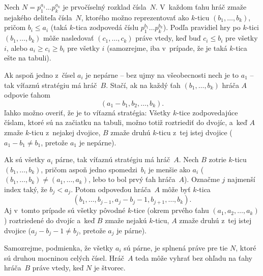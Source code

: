 {%
Nech $N=p_1^{a_1}\dots p_k^{a_k}$ je prvočíselný rozklad čísla~$N$.
V~každom ťahu hráč zmaže nejakého deliteľa čísla~$N$, ktorého možno reprezentovať ako $k$-ticu $(b_1,\dots,b_k)$, pričom $b_i\le a_i$
(taká $k$-tica zodpovedá číslu $p_1^{b_1}\dots p_k^{b_k}$). Podľa pravidiel hry po $k$-tici $(b_1,\dots,b_k)$ môže nasledovať $(c_1,\dots,c_k)$ práve vtedy, keď buď $c_{i}\le b_{i}$ pre všetky $i$, alebo
$a_i\ge c_i\ge b_{i}$ pre všetky $i$ (samozrejme, iba v~prípade, že je taká $k$-tica ešte na tabuli).

Ak aspoň jedno z~čísel $a_{i}$ je nepárne -- bez ujmy na všeobecnosti nech je to $a_1$ -- tak víťaznú stratégiu má hráč~$B$. Stačí, ak na každý ťah $(b_1,\dots,b_k)$ hráča $A$ odpovie ťahom
$$
(a_1-b_1,b_2,\dots,b_k).
$$
ľahko možno overiť, že je to víťazná stratégia: Všetky $k$-tice zodpovedajúce číslam, ktoré sú na začiatku na tabuli, možno totiž roztriediť do dvojíc, a~keď $A$ zmaže $k$-ticu z~nejakej dvojice, $B$ zmaže druhú $k$-ticu z~tej istej dvojice ($a_1-b_1\ne b_1$, pretože $a_1$ je nepárne).

\smallskip
Ak sú všetky $a_{i}$ párne, tak víťaznú stratégiu má hráč~$A$. Nech $B$ zotrie $k$-ticu $(b_1,\dots,b_k)$, pričom aspoň jedno spomedzi~$b_i$ je menšie ako $a_{i}$ ($(b_1,\dots,b_{k})\ne (a_1,\dots,a_k)$, lebo to bol prvý ťah hráča~$A$). Označme $j$ najmenší index taký, že $b_j<a_j$. Potom odpoveďou hráča~$A$ môže byť $k$-tica
$$
(b_1,\dots,b_{j-1},a_j-b_j-1,b_{j+1},\dots,b_{k}).
$$
Aj v~tomto prípade sú všetky pôvodné $k$-tice (okrem prvého ťahu $(a_1,a_2,\dots,a_k)$) roztriedené do dvojíc a~keď $B$ zmaže nejakú $k$-ticu, $A$ zmaže druhú z~tej istej dvojice ($a_j-b_j-1\ne b_j$, pretože $a_j$ je párne).

\smallskip
Samozrejme, podmienka, že všetky $a_{i}$ sú párne, je splnená práve pre tie $N$, ktoré sú druhou mocninou celých čísel. Hráč~$A$ teda môže vyhrať bez ohľadu na ťahy hráča~$B$ práve vtedy, keď $N$ je štvorec.}

